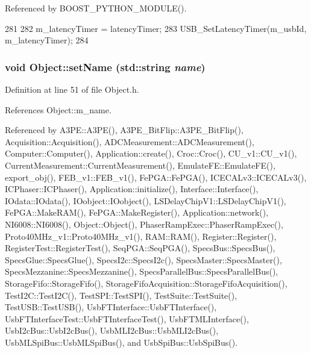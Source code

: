 Referenced by BOOST\_\-PYTHON\_\-MODULE().


\begin{DoxyCode}
281                                                     {
282     m_latencyTimer = latencyTimer;
283     USB_SetLatencyTimer(m_usbId, m_latencyTimer);
284   }
\end{DoxyCode}
\hypertarget{classObject_ae30fea75683c2d149b6b6d17c09ecd0c}{
\subsubsection[{setName}]{\setlength{\rightskip}{0pt plus 5cm}void Object::setName (std::string {\em name})}}
\label{classObject_ae30fea75683c2d149b6b6d17c09ecd0c}


Definition at line 51 of file Object.h.

References Object::m\_\-name.

Referenced by A3PE::A3PE(), A3PE\_\-BitFlip::A3PE\_\-BitFlip(), Acquisition::Acquisition(), ADCMeasurement::ADCMeasurement(), Computer::Computer(), Application::create(), Croc::Croc(), CU\_\-v1::CU\_\-v1(), CurrentMeasurement::CurrentMeasurement(), EmulateFE::EmulateFE(), export\_\-obj(), FEB\_\-v1::FEB\_\-v1(), FePGA::FePGA(), ICECALv3::ICECALv3(), ICPhaser::ICPhaser(), Application::initialize(), Interface::Interface(), IOdata::IOdata(), IOobject::IOobject(), LSDelayChipV1::LSDelayChipV1(), FePGA::MakeRAM(), FePGA::MakeRegister(), Application::network(), NI6008::NI6008(), Object::Object(), PhaserRampExec::PhaserRampExec(), Proto40MHz\_\-v1::Proto40MHz\_\-v1(), RAM::RAM(), Register::Register(), RegisterTest::RegisterTest(), SeqPGA::SeqPGA(), SpecsBus::SpecsBus(), SpecsGlue::SpecsGlue(), SpecsI2c::SpecsI2c(), SpecsMaster::SpecsMaster(), SpecsMezzanine::SpecsMezzanine(), SpecsParallelBus::SpecsParallelBus(), StorageFifo::StorageFifo(), StorageFifoAcquisition::StorageFifoAcquisition(), TestI2C::TestI2C(), TestSPI::TestSPI(), TestSuite::TestSuite(), TestUSB::TestUSB(), UsbFTInterface::UsbFTInterface(), UsbFTInterfaceTest::UsbFTInterfaceTest(), UsbFTMLInterface(), UsbI2cBus::UsbI2cBus(), UsbMLI2cBus::UsbMLI2cBus(), UsbMLSpiBus::UsbMLSpiBus(), and UsbSpiBus::UsbSpiBus().


